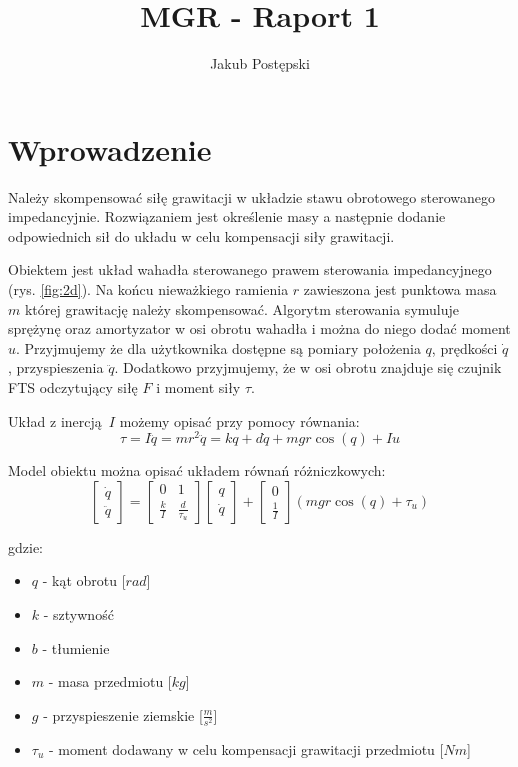 \documentclass[a4paper, 10pt]{article}
\title{MGR - Raport 1}
\author{Jakub Postępski}
\begin{document}
\maketitle

\section{Wprowadzenie}
Należy skompensować siłę grawitacji w układzie stawu obrotowego sterowanego impedancyjnie. Rozwiązaniem jest określenie masy a następnie dodanie odpowiednich sił do układu w celu kompensacji siły grawitacji.

Obiektem jest układ wahadła sterowanego prawem sterowania impedancyjnego (rys. \ref{fig:2d}). Na końcu nieważkiego ramienia $r$ zawieszona jest punktowa masa $m$ której grawitację należy skompensować. Algorytm sterowania symuluje sprężynę oraz amortyzator w osi obrotu wahadła i można do niego dodać moment $u$.  Przyjmujemy że dla użytkownika dostępne są pomiary położenia $q$, prędkości $\dot{q}$, przyspieszenia $\ddot{q}$. Dodatkowo przyjmujemy, że w osi obrotu znajduje się czujnik FTS odczytujący siłę $F$ i moment siły $\tau$.

Układ z inercją $I$ możemy opisać przy pomocy równania:
\begin{equation}
\label{eq:intro}
\tau = I\ddot{q} = mr^2\ddot{q} = kq + d\dot{q} + mgr\cos{(q)} + Iu
\end{equation}

Model obiektu można opisać układem równań różniczkowych:
\label{eq:intro2}
\begin{equation}
	\begin{bmatrix}
	    \dot{q} \\
	    \ddot{q}
	\end{bmatrix}
	=
	\begin{bmatrix}
	    0 & 1 \\
	    \frac{k}{I} & \frac{d}{\tau_u}
	\end{bmatrix}
	\begin{bmatrix}
		q \\
	    \dot{q}
	\end{bmatrix}
	+
	\begin{bmatrix}
	    0 \\
	    \frac{1}{I}
	\end{bmatrix}
	(mgr\cos{(q)} + \tau_u)
\end{equation}

gdzie:
\begin{itemize}
	\item $q$ - kąt obrotu [$rad$]
	\item $k$ - sztywność
	\item $b$ - tłumienie
	\item $m$ - masa przedmiotu [$kg$]
	\item $g$ - przyspieszenie ziemskie [$\frac{m}{s^2}$]
	\item $\tau_u$ - moment dodawany w celu kompensacji grawitacji przedmiotu [$Nm$]
\end{itemize}
\end{document}
